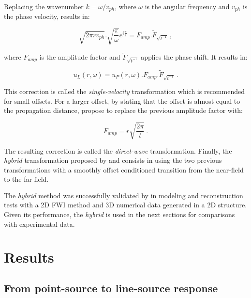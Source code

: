 \documentclass[paper,extra]{gji} %
\begin{document}
\noindent Replacing the wavenumber $k=\omega/v_{ph}$, where $\omega$ is the angular frequency and $v_{ph}$ is the phase velocity, results in:

\begin{equation}
\sqrt{2\pi r v_{ph}}.\sqrt{\frac{\pi}{\omega}}e^{i\frac{\pi}{4}}=F_{amp}.\widetilde{F}_{\sqrt{t^{-1}}}\ ,
\end{equation}

\noindent where $F_{amp}$ is the amplitude factor and $\widetilde{F}_{\sqrt{t^{-1}}}$ applies the phase shift. It results in:

\begin{equation}
u_{L}(r,\omega)=u_{P}(r,\omega).F_{amp}.\widetilde{F}_{\sqrt{t^{-1}}}\ .
\label{eq:single-velocity}
\end{equation}

\noindent This correction is called the \textit{single-velocity} transformation which is recommended for small offsets. For a larger offset, by stating that the offset is almost equal to the propagation distance, \citet{Schafer_LSS_2014} propose to replace the previous amplitude factor with:

\begin{equation}
\label{eq:direct-wave}
F_{amp}=r\sqrt{\frac{2 \pi}{t}}\ .
\end{equation}

\noindent The resulting correction is called the \textit{direct-wave} transformation. Finally, the \textit{hybrid} transformation proposed by \citet{Forbriger_LSS_2014} and \citet{Schafer_LSS_2014} consists in using the two previous transformations with a smoothly offset conditioned transition from the near-field to the far-field.

\noindent The \textit{hybrid} method was successfully validated by \citet{Schafer_LSS_2014} in modeling and reconstruction tests with a 2D FWI method and 3D numerical data generated in a 2D structure. Given its performance, the \textit{hybrid} is used in the next sections for comparisons with experimental data. 

\section{Results}

\subsection{From point-source to line-source response}
\end{document}
